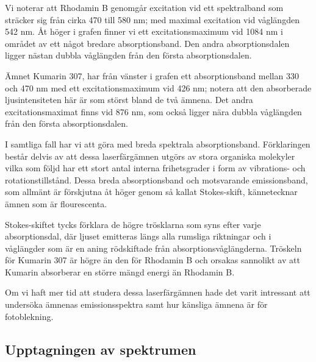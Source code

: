 \documentclass[11pt,a4paper]{article}
\begin{document}
Vi noterar att Rhodamin B genomgår excitation vid ett spektralband som
sträcker sig från cirka 470 till 580 nm; med maximal excitation vid
våglängden 542 nm. Åt höger i grafen finner vi ett excitationsmaximum
vid 1084 nm i området av ett något bredare absorptionsband. Den andra
absorptionsdalen ligger nästan dubbla våglängden från den första
absorptionsdalen. 

Ämnet Kumarin 307, har från vänster i grafen ett absorptionsband
mellan 330 och 470 nm med ett excitationsmaximum vid 426 nm; notera
att den absorberade ljusintensiteten här är som störst bland de två
ämnena. Det andra excitationsmaximat finns vid 876 nm, som också
ligger nära dubbla våglängden från den första absorptionsdalen. 

I samtliga fall har vi att göra med breda spektrala
absorptionsband. Förklaringen består delvis av att dessa
laserfärgämnen utgörs av stora organiska molekyler vilka som följd har
ett stort antal interna frihetsgrader i form av vibrations- och
rotationstillstånd. Dessa breda absorptionsband och motsvarande
emissionsband, som allmänt är förskjutna åt höger genom så kallat
Stokes-skift, kännetecknar ämnen som är flourescenta. 

Stokes-skiftet tycks förklara de högre trösklarna som syns efter varje
absorptionsdal, där ljuset emitteras längs alla rumsliga riktningar
och i våglängder som är en aning rödskiftade från
absorptionsvåglängderna. Tröskeln för Kumarin 307 är högre än den för
Rhodamin B och orsakas sannolikt av att Kumarin absorberar en större
mängd energi än Rhodamin B. 

Om vi haft mer tid att studera dessa laserfärgämnen hade det varit
intressant att undersöka ämnenas emissionsspektra samt hur känsliga
ämnena är för fotoblekning.






\subsection{Upptagningen av spektrumen}
\end{document}
